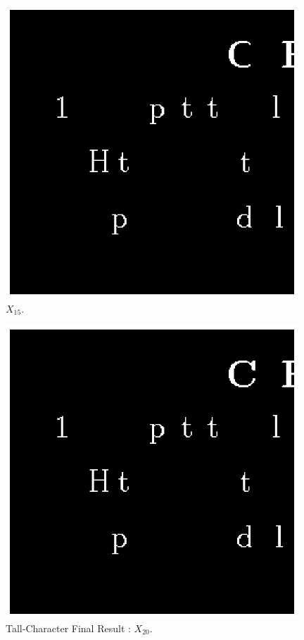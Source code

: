 \documentclass[paper=a4, fontsize=11pt]{scrartcl}
\begin{document}
\begin{figure}
	\centering
	\includegraphics[width=11cm]{Q1_X15.eps}
	\caption{$X_{15}$.}
	\label{fig:5}
\end{figure}

\begin{figure}
	\centering
	\includegraphics[width=11cm]{Q1_X20.eps}
	\caption{Tall-Character Final Result : $X_{20}$.}
	\label{fig:6}
\end{figure}
\end{document}
